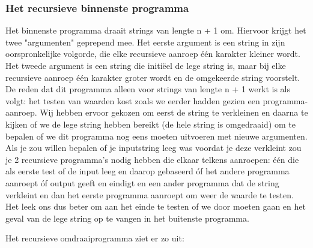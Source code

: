 \subsubsection{Het recursieve binnenste programma}
Het binnenste programma draait strings van lengte n + 1 om. Hiervoor krijgt het
twee "argumenten" geprepend mee. Het eerste argument is een string in zijn
oorspronkelijke volgorde, die elke recursieve aanroep \'{e}\'{e}n karakter
kleiner wordt. Het tweede argument is een string die initi\"{e}el de lege
string is, maar bij elke recursieve aanroep \'{e}\'{e}n karakter groter wordt
en de omgekeerde string voorstelt. De reden dat dit programma alleen voor
strings van lengte n + 1 werkt is als volgt: het testen van waarden kost zoals
we eerder hadden gezien een programma-aanroep. Wij hebben ervoor gekozen om
eerst de string te verkleinen en daarna te kijken of we de lege string hebben
bereikt (de hele string is omgedraaid) om te bepalen of we dit programma nog
eens moeten uitvoeren met nieuwe argumenten. Als je zou willen bepalen of je
inputstring leeg was voordat je deze verkleint zou je 2 recursieve programma's
nodig hebben die elkaar telkens aanroepen: \'{e}\'{e}n die als eerste test of
de input leeg en daarop gebaseerd \'{o}f het andere programma aanroept \'{o}f
output geeft en eindigt en een ander programma dat de string verkleint en dan
het eerste programma aanroept om weer de waarde te testen. Het leek ons dus
beter om aan het einde te testen of we door moeten gaan en het geval van de
lege string op te vangen in het buitenste programma.

Het recursieve omdraaiprogramma ziet er zo uit:

